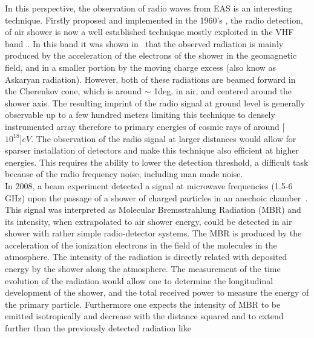 In this perspective, the observation  of radio  waves  from  EAS  is an interesting technique. Firstly  proposed  and implemented in the 1960's  \cite{jelley65}, the radio detection,  of air shower is now  a well established technique mostly exploited in    the   VHF    band~\cite{huegeradioreview}.     In this band it was    shown in~\cite{augerradio} that the observed radiation is mainly produced by
the acceleration  of the  electrons of the  shower in  the geomagnetic
field, and in a smaller portion by the moving charge excess (also know
as Askaryan radiation).  However,  both of these radiations are beamed
forward in the  Cherenkov cone, which is around $\sim$ 1deg.  in  air, and centered around the shower axis.  The resulting  imprint of the radio signal at ground level is generally observable up to a few hundred meters limiting this
technique to densely instrumented  array therefore to primary energies of cosmic rays of around \unit[$10^{18}]{eV}$. The observation of the radio signal at larger distances would allow for sparser installation of detectors and make this technique also efficient at higher energies. This requires the ability to lower the detection threshold, a difficult task because of the radio frequency noise, including man made noise.  \\In 2008, a beam experiment detected
a signal  at microwave  frequencies (1.5-6 GHz) upon  the passage  of a
shower  of  charged particles  in  an anechoic  chamber~\cite{Gorham}.
This signal was interpreted  as Molecular Bremsstrahlung Radiation (MBR) and
its  intensity,  when extrapolated  to  air  shower  energy, could  be
detected in air shower with rather simple radio-detector systems.  The
MBR is produced by the acceleration of the ionization electrons in the
field  of the  molecules  in  the atmosphere.   The  intensity of  the
radiation is directly related with deposited energy by the shower
along the  atmosphere.  The measurement  of the time evolution  of the
radiation would allow one to determine the longitudinal development of
the shower, and the total received  power to measure the energy of the
primary particle.  Furthermore one expects  the intensity of MBR to be
emitted isotropically  and decrease with  the distance squared  and to
extend   further   than  the   previously   detected  radiation   like

